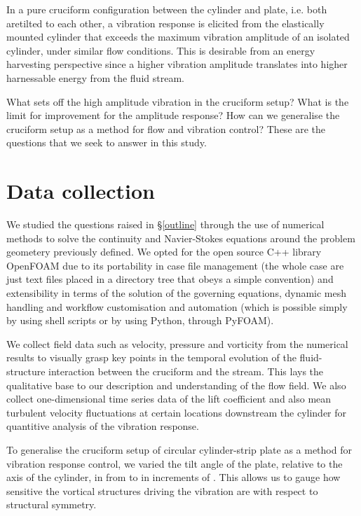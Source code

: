 \documentclass[a4paper]{article}
\begin{document}
In a pure cruciform configuration between the cylinder and plate, i.e. both aretilted \rfo{} to each other, a vibration response is elicited from the elastically mounted cylinder that exceeds the maximum vibration amplitude of an isolated cylinder, under similar flow conditions. This is desirable from an energy harvesting perspective since a higher vibration amplitude translates into higher harnessable energy from the fluid stream.

What sets off the high amplitude vibration in the cruciform setup? What is the limit for improvement for the amplitude response? How can we generalise the cruciform setup as a method for flow and vibration control? These are the questions that we seek to answer in this study.

\section{Data collection} \label{collection}
We studied the questions raised in \S\ref{outline} through the use of numerical methods to solve the continuity and Navier-Stokes equations around the problem geometery previously defined. We opted for the open source C++ library OpenFOAM due to its portability in case file management (the whole case are just text files placed in a directory tree that obeys a simple convention) and extensibility in terms of the solution of the governing equations, dynamic mesh handling and workflow customisation and automation (which is possible simply by using shell scripts or by using Python, through PyFOAM).

We collect field data such as velocity, pressure and vorticity from the numerical results to visually grasp key points in the temporal evolution of the fluid-structure interaction between the cruciform and the stream. This lays the qualitative base to our description and understanding of the flow field. We also collect one-dimensional time series data of the lift coefficient and also mean turbulent velocity fluctuations at certain locations downstream the cylinder for quantitive analysis of the vibration response.

To generalise the cruciform setup of circular cylinder-strip plate as a method for vibration response control, we varied the tilt angle of the plate, relative to the axis of the cylinder, in from \rze{} to \rfo{} in increments of \ron{}. This allows us to gauge how sensitive the vortical structures driving the vibration are with respect to structural symmetry.
\end{document}

